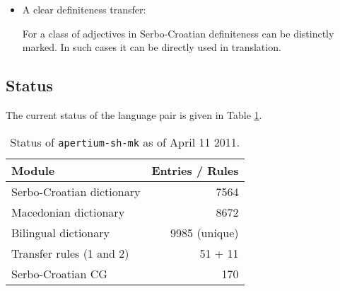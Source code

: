 \documentclass{book}
\begin{document}
\begin{itemize}
{U sastavu Vojske Srbije $\rightarrow$ Во составот на Српската војска\footnote{The article in Macedonian
attaches to the first constituent of the noun phrase.}

[in] [composition] [of Serbian Army] $\rightarrow$ [in] [composition{\sc.def}] [of Serbian Army]

(In the composition of the Serbian Army)

}

The definite article in Macedonian has no analogy in Serbo-Croatian (except to some extent the definiteness of adjectives). This transfer rule infers definiteness for a common noun preceding
a proper noun in genitive.

\item A clear definiteness transfer:


For a class of adjectives in Serbo-Croatian definiteness can be
distinctly marked. In such cases it can be directly used in translation.
\end{itemize}

\subsection*{Status}
The current status of the language pair is given in Table \ref{tab:status}.

\begin{table}
\begin{center}
\caption{Status of \texttt{apertium-sh-mk} as of April 11 2011.}
\label{tab:status}
\begin{tabular}{l|r}
Module & Entries / Rules \\
\hline
Serbo-Croatian dictionary & 7564 \\
Macedonian dictionary & 8672 \\
Bilingual dictionary & 9985 (unique) \\
Transfer rules (1 and 2) & 51 + 11 \\
Serbo-Croatian CG & 170 \\
\hline
\end{tabular}
\end{center}
\end{table}
\end{document}
